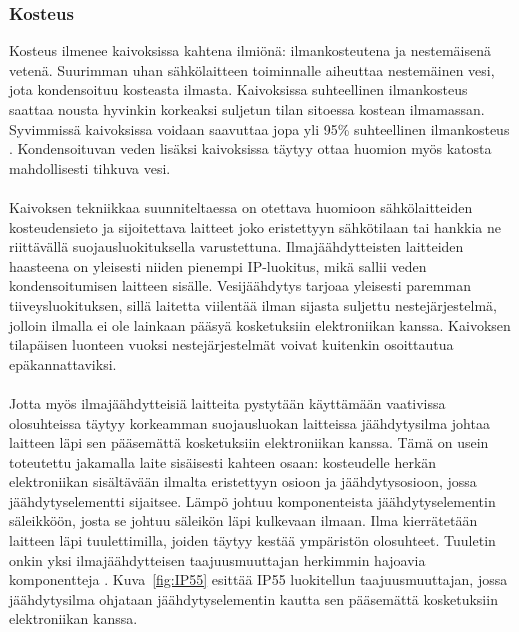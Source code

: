 \documentclass[finnish,12pt,a4paper,pdftex,elec,utf8]{aaltothesis}
\begin{document}

\subsubsection{Kosteus}
Kosteus ilmenee kaivoksissa kahtena ilmiönä: ilmankosteutena ja nestemäisenä vetenä. Suurimman uhan sähkölaitteen toiminnalle aiheuttaa nestemäinen vesi, jota kondensoituu kosteasta ilmasta. Kaivoksissa suhteellinen ilmankosteus saattaa nousta hyvinkin korkeaksi suljetun tilan sitoessa kostean ilmamassan.  Syvimmissä kaivoksissa voidaan saavuttaa jopa yli 95\% suhteellinen ilmankosteus \cite{manchao}. Kondensoituvan veden lisäksi kaivoksissa täytyy ottaa huomion myös katosta mahdollisesti tihkuva vesi.
\\\\
Kaivoksen tekniikkaa suunniteltaessa on otettava huomioon sähkölaitteiden kosteudensieto ja sijoitettava laitteet joko eristettyyn sähkötilaan tai hankkia ne riittävällä suojausluokituksella varustettuna. Ilmajäähdytteisten laitteiden haasteena on yleisesti niiden pienempi IP-luokitus, mikä sallii veden kondensoitumisen laitteen sisälle\cite{Pallasmaa}. Vesijäähdytys tarjoaa yleisesti paremman tiiveysluokituksen, sillä laitetta viilentää ilman sijasta suljettu nestejärjestelmä, jolloin ilmalla ei ole lainkaan pääsyä kosketuksiin elektroniikan kanssa. Kaivoksen tilapäisen luonteen vuoksi nestejärjestelmät voivat kuitenkin osoittautua epäkannattaviksi.
\\\\
Jotta myös ilmajäähdytteisiä laitteita pystytään käyttämään vaativissa olosuhteissa täytyy korkeamman suojausluokan laitteissa jäähdytysilma johtaa laitteen läpi sen pääsemättä kosketuksiin elektroniikan kanssa. Tämä on usein toteutettu jakamalla laite sisäisesti kahteen osaan: kosteudelle herkän elektroniikan sisältävään ilmalta eristettyyn osioon ja jäähdytysosioon, jossa jäähdytyselementti  sijaitsee.  Lämpö johtuu komponenteista jäähdytyselementin säleikköön, josta se johtuu säleikön läpi kulkevaan ilmaan. Ilma kierrätetään laitteen läpi tuulettimilla, joiden täytyy kestää ympäristön olosuhteet. Tuuletin onkin yksi ilmajäähdytteisen taajuusmuuttajan herkimmin hajoavia komponentteja \cite{Muttilainen}. Kuva~\ref{fig:IP55} esittää IP55 luokitellun taajuusmuuttajan, jossa jäähdytysilma ohjataan jäähdytyselementin kautta sen pääsemättä kosketuksiin elektroniikan kanssa.
\end{document}
